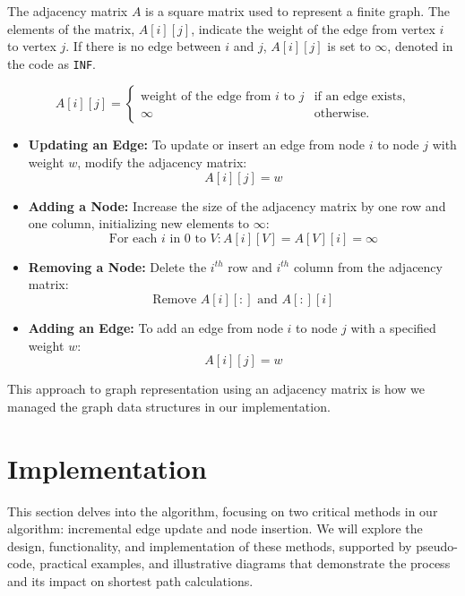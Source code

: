 \documentclass[conference]{IEEEtran}
\begin{document}
The adjacency matrix $A$ is a square matrix used to represent a finite graph. The elements of the matrix, $A[i][j]$, indicate the weight of the edge from vertex $i$ to vertex $j$. If there is no edge between $i$ and $j$, $A[i][j]$ is set to $\infty$, denoted in the code as \texttt{INF}.

\[
A[i][j] = 
\begin{cases} 
\text{weight of the edge from } i \text{ to } j & \text{if an edge exists,} \\
\infty & \text{otherwise}.
\end{cases}
\]

\begin{itemize}
    \item \textbf{Updating an Edge:} To update or insert an edge from node $i$ to node $j$ with weight $w$, modify the adjacency matrix:
    \[A[i][j] = w\]
    \item \textbf{Adding a Node:} Increase the size of the adjacency matrix by one row and one column, initializing new elements to $\infty$:
    \[\text{For each } i \text{ in } 0 \text{ to } V: A[i][V] = A[V][i] = \infty\]
    \item \textbf{Removing a Node:} Delete the $i^{th}$ row and $i^{th}$ column from the adjacency matrix:
    \[\text{Remove } A[i][:] \text{ and } A[:][i]\]
    \item \textbf{Adding an Edge:} To add an edge from node $i$ to node $j$ with a specified weight $w$:
    \[A[i][j] = w\]
    
\end{itemize}

This approach to graph representation using an adjacency matrix is how we managed the graph data structures in our implementation.



\section{Implementation}
This section delves into the algorithm, focusing on two critical methods in our algorithm: incremental edge update and node insertion. We will explore the design, functionality, and implementation of these methods, supported by pseudo-code, practical examples, and illustrative diagrams that demonstrate the process and its impact on shortest path calculations.



\end{document}
